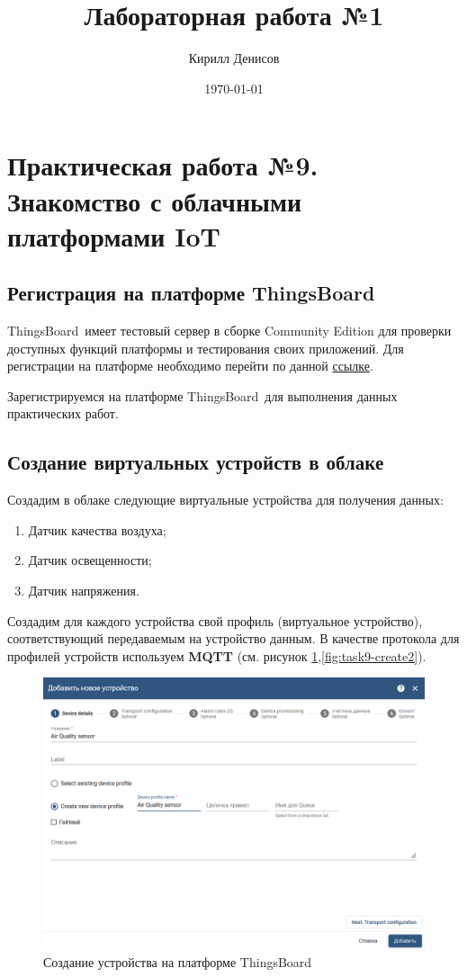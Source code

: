 \documentclass[a4paper,14pt]{extarticle}
\author{Кирилл Денисов}
\title{Лабораторная работа №1}
\date{\today}
\newcommand{\pathToCommonFolder}{/home/denilai/Documents/repos/latex/Common}
\newcommand{\tb}{ThingsBoard~}
\begin{document}
	\thispagestyle{empty}
	
	\newpage
	\tableofcontents
	\newpage

\normalsize

\section{Практическая работа №9.\\Знакомство с облачными платформами IoT}
\subsection{Регистрация на платформе \tb}

\tb имеет тестовый сервер в сборке Community Edition для проверки доступных
функций платформы и тестирования своих приложений. Для регистрации на платформе
необходимо перейти по данной  \href{https://demo.\tb.io/signup}{ссылке}.

Зарегистрируемся на платформе \tb для выполнения данных практических работ.

\subsection{Создание виртуальных устройств в облаке}

Создадим в облаке следующие виртуальные устройства для получения данных:


\begin{enumerate}
	\item Датчик качества воздуха;
	\item Датчик освещенности;
	\item Датчик напряжения.
\end{enumerate}

Создадим для каждого устройства свой профиль (виртуальное устройство), соответствующий передаваемым на
устройство данным. В качестве протокола для профилей устройств используем \textbf{MQTT} (см. рисунок \ref{fig:task9-create},\ref{fig:task9-create2}).
\begin{figure}[h!]
	\centering
	\includegraphics[width=0.7\linewidth]{images/task9-create}
	\caption{Создание устройства на платформе \tb}
	\label{fig:task9-create}
\end{figure}
\end{document}
